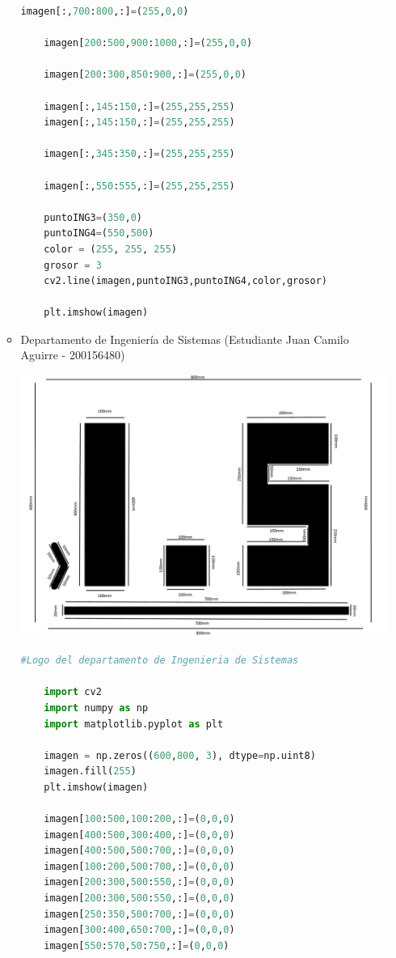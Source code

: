 \begin{enumerate}
\begin{itemize}
\begin{lstlisting}[language=Python]
    imagen[:,700:800,:]=(255,0,0)
    
    imagen[200:500,900:1000,:]=(255,0,0)
    
    imagen[200:300,850:900,:]=(255,0,0)
    
    imagen[:,145:150,:]=(255,255,255)
    imagen[:,145:150,:]=(255,255,255)
    
    imagen[:,345:350,:]=(255,255,255)
    
    imagen[:,550:555,:]=(255,255,255)
    
    puntoING3=(350,0)
    puntoING4=(550,500)
    color = (255, 255, 255)
    grosor = 3
    cv2.line(imagen,puntoING3,puntoING4,color,grosor)
    
    plt.imshow(imagen)
    \end{lstlisting}
    \item Departamento de Ingeniería de Sistemas (Estudiante Juan Camilo Aguirre - 200156480)
    \begin{center}
    \includegraphics[width=125mm]{imagenes-colab/maquetais.png}
    \end{center}
    \begin{lstlisting}[language=Python]
    #Logo del departamento de Ingenieria de Sistemas

    import cv2
    import numpy as np
    import matplotlib.pyplot as plt
    
    imagen = np.zeros((600,800, 3), dtype=np.uint8)
    imagen.fill(255)
    plt.imshow(imagen)
    
    imagen[100:500,100:200,:]=(0,0,0)
    imagen[400:500,300:400,:]=(0,0,0)
    imagen[400:500,500:700,:]=(0,0,0)
    imagen[100:200,500:700,:]=(0,0,0)
    imagen[200:300,500:550,:]=(0,0,0)
    imagen[200:300,500:550,:]=(0,0,0)
    imagen[250:350,500:700,:]=(0,0,0)
    imagen[300:400,650:700,:]=(0,0,0)
    imagen[550:570,50:750,:]=(0,0,0)
    

\end{lstlisting}
\end{itemize}
\end{enumerate}
